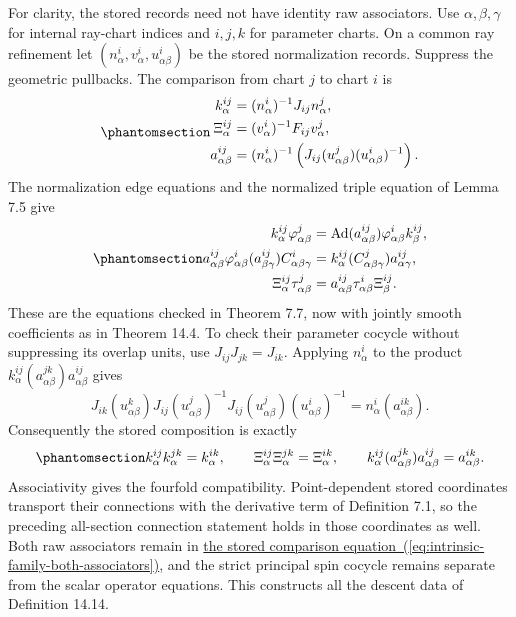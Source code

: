 \documentclass[
  english,
  11pt,
  reqno]{amsart}
\begin{document}
For clarity, the stored records need not have identity raw associators.
Use \(\alpha,\beta,\gamma\) for internal ray-chart indices and \(i,j,k\)
for parameter charts. On a common ray refinement let
\((n^i_\alpha,v^i_\alpha,u^i_{\alpha\beta})\) be the stored
normalization records. Suppress the geometric pullbacks. The comparison
from chart \(j\) to chart \(i\) is
\begin{equation}\protect\phantomsection\label{eq:intrinsic-family-stored-transition}{
\begin{aligned}
k^{ij}_\alpha&=(n^i_\alpha)^{-1}J_{ij}n^j_\alpha,\\
\Xi^{ij}_\alpha&=(v^i_\alpha)^{-1}F_{ij}v^j_\alpha,\\
a^{ij}_{\alpha\beta}
&=(n^i_\alpha)^{-1}
\left(J_{ij}(u^j_{\alpha\beta})(u^i_{\alpha\beta})^{-1}\right).
\end{aligned}
}\end{equation} The normalization edge equations and the normalized
triple equation of Lemma 7.5 give
\begin{equation}\protect\phantomsection\label{eq:intrinsic-family-both-associators}{
\begin{aligned}
k^{ij}_\alpha\varphi^j_{\alpha\beta}
&=\operatorname{Ad}(a^{ij}_{\alpha\beta})
\varphi^i_{\alpha\beta}k^{ij}_\beta,\\
a^{ij}_{\alpha\beta}
\varphi^i_{\alpha\beta}(a^{ij}_{\beta\gamma})
C^i_{\alpha\beta\gamma}
&=k^{ij}_\alpha(C^j_{\alpha\beta\gamma})
a^{ij}_{\alpha\gamma},\\
\Xi^{ij}_\alpha\tau^j_{\alpha\beta}
&=a^{ij}_{\alpha\beta}\tau^i_{\alpha\beta}\Xi^{ij}_\beta.
\end{aligned}
}\end{equation} These are the equations checked in Theorem 7.7, now with
jointly smooth coefficients as in Theorem 14.4. To check their parameter
cocycle without suppressing its overlap units, use
\(J_{ij}J_{jk}=J_{ik}\). Applying \(n^i_\alpha\) to the product
\(k^{ij}_\alpha(a^{jk}_{\alpha\beta})a^{ij}_{\alpha\beta}\) gives \[
J_{ik}(u^k_{\alpha\beta})
J_{ij}(u^j_{\alpha\beta})^{-1}
J_{ij}(u^j_{\alpha\beta})
(u^i_{\alpha\beta})^{-1}
=n^i_\alpha(a^{ik}_{\alpha\beta}).
\] Consequently the stored composition is exactly
\begin{equation}\protect\phantomsection\label{eq:intrinsic-stored-parameter-cocycle}{
k^{ij}_\alpha k^{jk}_\alpha=k^{ik}_\alpha,
\qquad
\Xi^{ij}_\alpha\Xi^{jk}_\alpha=\Xi^{ik}_\alpha,
\qquad
k^{ij}_\alpha(a^{jk}_{\alpha\beta})a^{ij}_{\alpha\beta}
=a^{ik}_{\alpha\beta}.
}\end{equation} Associativity gives the fourfold compatibility.
Point-dependent stored coordinates transport their connections with the
derivative term of Definition 7.1, so the preceding all-section
connection statement holds in those coordinates as well. Both raw
associators remain in
\hyperref[eq:intrinsic-family-both-associators]{the stored comparison
equation~(\ref*{eq:intrinsic-family-both-associators})}, and the strict principal spin cocycle remains separate from
the scalar operator equations. This constructs all the descent data of
Definition 14.14.
\end{document}
